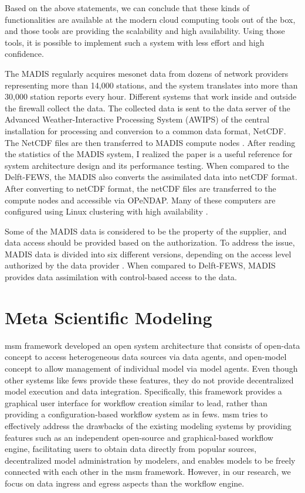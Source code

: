 Based on the above statements, we can conclude that these kinds of functionalities are available at the modern cloud computing tools out of the box, and those tools are providing the scalability and high availability. Using those tools, it is possible to implement such a system with less effort and high confidence.

The MADIS regularly acquires mesonet data from dozens of network providers representing more than 14,000 stations, and the system translates into more than 30,000 station reports every hour. Different systems that work inside and outside the firewall collect the data. The collected data is sent to the data server of the Advanced Weather-Interactive Processing System (AWIPS) of the central installation for processing and conversion to a common data format, NetCDF. The NetCDF files are then transferred to MADIS compute nodes \cite{Macdermaid2005ArchitectureP2.39}. After reading the statistics of the MADIS system, I realized the paper is a useful reference for system architecture design and its performance testing. When compared to the Delft-FEWS, the MADIS also converts the assimilated data into netCDF format. After converting to netCDF format, the netCDF files are transferred to the compute nodes and accessible via OPeNDAP. Many of these computers are configured using Linux clustering with high availability \cite{Macdermaid2005ArchitectureP2.39}.

Some of the MADIS data is considered to be the property of the supplier, and data access should be provided based on the authorization. To address the issue, MADIS data is divided into six different versions, depending on the access level authorized by the data provider \cite{Macdermaid2005ArchitectureP2.39}. When compared to Delft-FEWS, MADIS provides data assimilation with control-based access to the data.

\section{Meta Scientific Modeling}
\label{se:msm}

\acrfull{msm} framework developed an open system architecture that consists of open-data concept to access heterogeneous data sources via data agents, and open-model concept to allow management of individual model via model agents. Even though other systems like \acrshort{fews} provide these features, they do not provide decentralized model execution and data integration. Specifically, this framework provides a graphical user interface for workflow creation similar to \acrshort{lead}, rather than providing a configuration-based workflow system as in \acrshort{fews}. \acrshort{msm} tries to effectively address the drawbacks of the existing modeling systems by providing features such as an independent open-source and graphical-based workflow engine, facilitating  users to obtain data directly from popular sources, decentralized model administration by modelers, and enables models to be freely connected with each other in the \acrshort{msm} framework. However, in our research, we focus on data ingress and egress aspects than the workflow engine.

